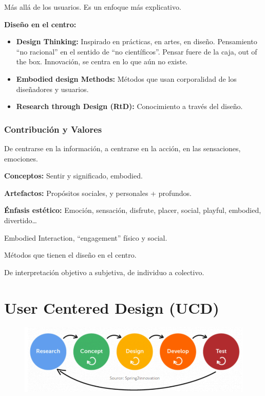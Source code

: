 \documentclass[12pt]{report} %
\begin{document}
Más allá de los usuarios. Es un enfoque más explicativo.

\textbf{Diseño en el centro:}

\begin{itemize}
\item
  \textbf{Design Thinking:} Inspirado en prácticas, en artes, en diseño.
  Pensamiento ``no racional'' en el sentido de ``no científicos''.
  Pensar fuere de la caja, out of the box. Innovación, se centra en lo
  que aún no existe.
\item
  \textbf{Embodied design Methods:} Métodos que usan corporalidad de los
  diseñadores y usuarios.
\item
  \textbf{Research through Design (RtD):} Conocimiento a través del
  diseño.
\end{itemize}

\subsubsection{Contribución y Valores}

De centrarse en la información, a centrarse en la acción, en las
sensaciones, emociones.

\textbf{Conceptos:} Sentir y significado, embodied.

\textbf{Artefactos:} Propósitos sociales, y personales + profundos.

\textbf{Énfasis estético:} Emoción, sensación, disfrute, placer, social,
playful, embodied, divertido\ldots{}

Embodied Interaction, ``engagement'' físico y social.

Métodos que tienen el diseño en el centro.

De interpretación objetivo a subjetiva, de individuo a colectivo.

\newpage

\section{User Centered Design (UCD)}

\begin{figure}[H]
	{\includegraphics[scale=.4]{image-20210312134547277.png}}
\end{figure}
\end{document}
